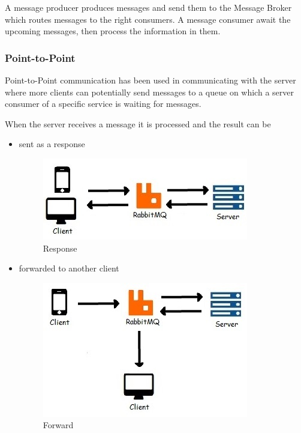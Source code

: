\documentclass[a4paper,12pt]{report}
\begin{document}
A message producer produces messages and send them to the Message Broker which
routes messages to the right consumers. A message consumer await the upcoming messages, then process the information in them.

\subsubsection{Point-to-Point}
Point-to-Point communication has been used in communicating with the server where more clients can potentially send messages to a queue on which a server consumer of a specific service is waiting for messages.

When the server receives a message it is processed and the result can be 
\begin{itemize}
\item sent as a response 
\begin{figure}[ht]
\centering
\includegraphics{figures/RPC.jpg}
\caption{Response}
\label{fig:RPC}
\end{figure}
\item forwarded to another client
\begin{figure}[ht]
\centering
\includegraphics{figures/forward.jpg}
\caption{Forward}
\label{fig:forward}
\end{figure}
\end{itemize}
\end{document}
